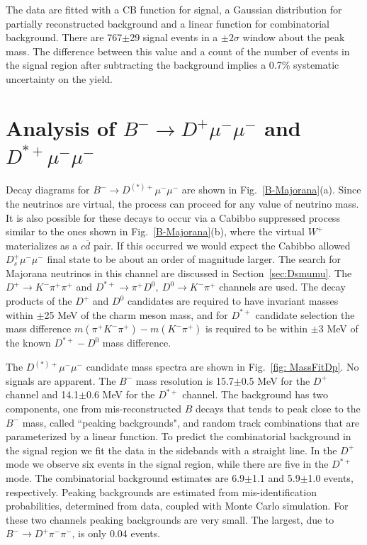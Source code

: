 \documentclass[12pt,a4paper]{article}
\def\to                 {\ensuremath{\rightarrow}\xspace}
\begin{document}
The data are fitted with a CB function for signal, a Gaussian distribution for partially reconstructed background and a linear function for combinatorial background. There are
767$\pm$29 signal events in a $\pm 2\sigma$ window about the peak mass. The difference between this value and a count of the number of events in the signal region after subtracting the background implies a 0.7\% systematic uncertainty on the yield. 

\section{\boldmath Analysis of $B^-\to D^+\mu^-\mu^-$ and $D^{*+}\mu^-\mu^-$}
Decay diagrams for $B^-\to D^{(*)+}\mu^-\mu^-$ are shown in Fig.~\ref{B-Majorana}(a).  Since the neutrinos are virtual, the process can proceed for any value of neutrino mass. It is also possible for these decays to occur via a Cabibbo suppressed process similar to the ones shown in Fig.~\ref{B-Majorana}(b), where the virtual $W^+$ materializes as a $c\overline{d}$ pair. If this occurred we would expect the Cabibbo allowed $D_s^+\mu^-\mu^-$ final state to be about an order of magnitude larger. The search for Majorana neutrinos in this channel are discussed in Section~\ref{sec:Dsmumu}. The $D^+\to K^-\pi^+\pi^+$ and $D^{*+}\to \pi^+ D^0,~D^0\to K^-\pi^+$ channels are used. The decay products of the $D^+$ and $D^0$ candidates are required to have invariant masses within $\pm$25 MeV of the charm meson mass, and for $D^{*+}$ candidate selection the mass difference  $m(\pi^+ K^-\pi^+)-m(K^-\pi^+)$ is required to be within $\pm3$ MeV of the known $D^{*+}-D^0$ mass difference.


The $D^{(*)+}\mu^-\mu^-$ candidate mass spectra are shown in Fig.~\ref{fig: MassFitDp}. No signals are apparent.  The $B^-$ mass resolution is 15.7$\pm$0.5 MeV for the $D^+$ channel and 14.1$\pm$0.6 MeV for the $D^{*+}$ channel. 
The background has two components, one from mis-reconstructed $B$ decays that tends to peak close to the $B^-$ mass, called ``peaking backgrounds", and random track combinations that are parameterized by a linear function. 
To predict the combinatorial background in the signal region we fit the data in the sidebands with a straight line. In the $D^+$ mode we observe six events in the signal region, while there are five in the $D^{*+}$ mode.
The combinatorial background estimates are 6.9$\pm$1.1 and 5.9$\pm$1.0 events, respectively.  Peaking backgrounds are estimated from mis-identification probabilities, determined from data, coupled with Monte Carlo simulation. For these two channels peaking backgrounds are very small. The largest, due to $B^-\to D^+\pi^-\pi^-$, is only 0.04 events.
\end{document}
